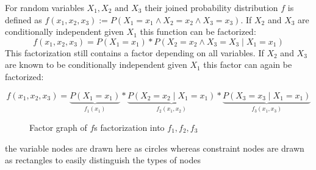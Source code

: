\begin{example}
For random variables $X_1, X_2 \text{ and } X_3$ their joined probability distribution $f$ is defined as $f(x_1, x_2, x_3) := P(X_1 = x_1 \land X_2  = x_2 \land X_3 = x_3)$. If $X_2$ and $X_3$ are conditionally independent given $X_1$ this function can be factorized: $$f(x_1, x_2, x_3) = P(X_1 = x_1) * P(X_2 = x_2 \land X_3 = X_3 \; | \; X_1 = x_1)$$
This factorization still contains a factor depending on all variables. If $X_2$ and $X_3$ are known to be conditionally independent given $X_1$ this factor can again be factorized:

$$f(x_1, x_2, x_3) = \underbrace{P(X_1 = x_1)}_{f_1(x_1)} * \underbrace{P(X_2 = x_2 \; | \; X_1 = x_1)}_{f_2(x_1, x_2)} * \underbrace{P(X_3 = x_3 \; | \; X_1 = x_1)}_{f_3(x_1, x_3)}$$

\begin{figure}
\centering

\caption{Factor graph of $f$s factorization into $f_1, f_2, f_3$}
\end{figure}

the variable nodes are drawn here as circles whereas constraint nodes are drawn as rectangles to easily distinguish the types of nodes

\end{example}
%


